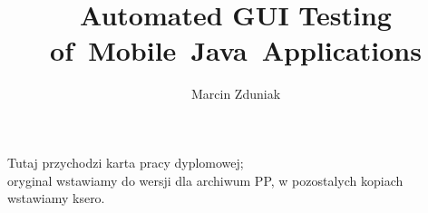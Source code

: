 \documentclass[english,a4paper,oneside]{ppfcmthesis}
\author{Marcin Zduniak}
\title{Automated GUI Testing of~Mobile~Java~Applications}
\begin{document}
\frontmatter\pagestyle{empty}%
\maketitle\cleardoublepage%

\thispagestyle{empty}\vspace*{\fill}%
\begin{center}Tutaj przychodzi karta pracy dyplomowej;\\oryginal wstawiamy do wersji dla archiwum PP, w pozostalych kopiach wstawiamy ksero.\end{center}%
\vfill\cleardoublepage%

\pagestyle{ppfcmthesis}%
\tableofcontents* \cleardoublepage%

\mainmatter%







\cleardoublepage\appendix%
%

{\raggedright\sloppy\small}



\ppcolophon
\end{document}
